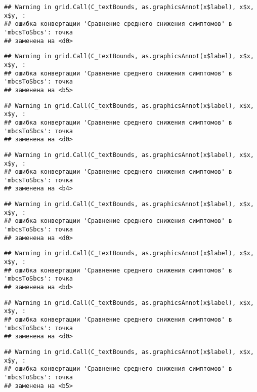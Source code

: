 \documentclass[
]{article}
\begin{document}
\begin{verbatim}
## Warning in grid.Call(C_textBounds, as.graphicsAnnot(x$label), x$x, x$y, :
## ошибка конвертации 'Сравнение среднего снижения симптомов' в 'mbcsToSbcs': точка
## заменена на <d0>
\end{verbatim}

\begin{verbatim}
## Warning in grid.Call(C_textBounds, as.graphicsAnnot(x$label), x$x, x$y, :
## ошибка конвертации 'Сравнение среднего снижения симптомов' в 'mbcsToSbcs': точка
## заменена на <b5>
\end{verbatim}

\begin{verbatim}
## Warning in grid.Call(C_textBounds, as.graphicsAnnot(x$label), x$x, x$y, :
## ошибка конвертации 'Сравнение среднего снижения симптомов' в 'mbcsToSbcs': точка
## заменена на <d0>
\end{verbatim}

\begin{verbatim}
## Warning in grid.Call(C_textBounds, as.graphicsAnnot(x$label), x$x, x$y, :
## ошибка конвертации 'Сравнение среднего снижения симптомов' в 'mbcsToSbcs': точка
## заменена на <b4>
\end{verbatim}

\begin{verbatim}
## Warning in grid.Call(C_textBounds, as.graphicsAnnot(x$label), x$x, x$y, :
## ошибка конвертации 'Сравнение среднего снижения симптомов' в 'mbcsToSbcs': точка
## заменена на <d0>
\end{verbatim}

\begin{verbatim}
## Warning in grid.Call(C_textBounds, as.graphicsAnnot(x$label), x$x, x$y, :
## ошибка конвертации 'Сравнение среднего снижения симптомов' в 'mbcsToSbcs': точка
## заменена на <bd>
\end{verbatim}

\begin{verbatim}
## Warning in grid.Call(C_textBounds, as.graphicsAnnot(x$label), x$x, x$y, :
## ошибка конвертации 'Сравнение среднего снижения симптомов' в 'mbcsToSbcs': точка
## заменена на <d0>
\end{verbatim}

\begin{verbatim}
## Warning in grid.Call(C_textBounds, as.graphicsAnnot(x$label), x$x, x$y, :
## ошибка конвертации 'Сравнение среднего снижения симптомов' в 'mbcsToSbcs': точка
## заменена на <b5>
\end{verbatim}
\end{document}
